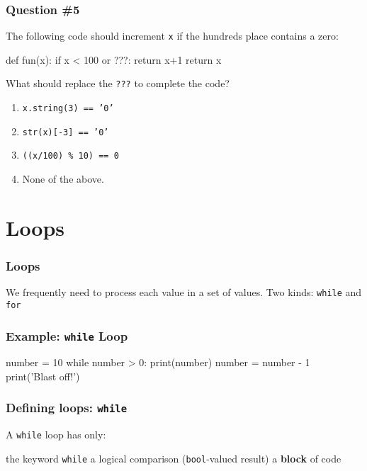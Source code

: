\documentclass[11pt]{beamer}
\begin{document}
\begin{frame}[fragile]
  \frametitle{Question \#5}
  \Enlarge

  The following code should increment \texttt{x} if the hundreds place contains a zero:
  \begin{semiverbatim}
def fun(x):
    if x < 100 or ???:
        return x+1
    return x
  \end{semiverbatim}
  What should replace the \texttt{???} to complete the code?
  \begin{enumerate}[label=\Alph*]
  \item  \texttt{x.string(3) == '0'}
  \item  \texttt{str(x)[-3] == '0'}
  \item  \texttt{((x/100) \% 10) == 0}
  \item  None of the above.
  \end{enumerate}
\end{frame}

\section{Loops}

\begin{frame}[fragile]
  \frametitle{Loops}
  \Enlarge

  \begin{itemize}
  \myitem  We frequently need to process each value in a set of values. \pause
  \myitem  Two kinds:  \texttt{while} and \texttt{for}
  \end{itemize}
\end{frame}

\begin{frame}[fragile]
  \frametitle{Example:  \texttt{while} Loop}
  \Enlarge

  \begin{semiverbatim}
number = 10
while number > 0:
    print(number)
    number = number - 1
print('Blast off!')
  \end{semiverbatim}
\end{frame}

\begin{frame}[fragile]
  \frametitle{Defining loops:  \texttt{while}}
  \Enlarge

  \begin{itemize}
  \myitem  A \texttt{while} loop has only:
    \begin{itemize}
    \mysubitem  the keyword \texttt{while}
    \mysubitem  a logical comparison (\texttt{bool}-valued result)
    \mysubitem  a \textbf{block} of code
    \end{itemize}
  \end{itemize}
\end{frame}
\end{document}
